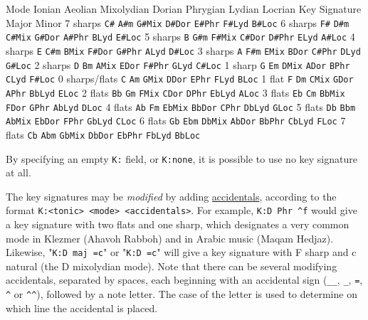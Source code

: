 \documentclass[oneside]{book}
\begin{document}
Mode Ionian Aeolian Mixolydian Dorian Phrygian Lydian Locrian Key
Signature Major Minor 7 sharps \texttt{C\#} \texttt{A\#m}
\texttt{G\#Mix} \texttt{D\#Dor} \texttt{E\#Phr} \texttt{F\#Lyd}
\texttt{B\#Loc} 6 sharps \texttt{F\#} \texttt{D\#m} \texttt{C\#Mix}
\texttt{G\#Dor} \texttt{A\#Phr} \texttt{BLyd} \texttt{E\#Loc} 5 sharps
\texttt{B} \texttt{G\#m} \texttt{F\#Mix} \texttt{C\#Dor} \texttt{D\#Phr}
\texttt{ELyd} \texttt{A\#Loc} 4 sharps \texttt{E} \texttt{C\#m}
\texttt{BMix} \texttt{F\#Dor} \texttt{G\#Phr} \texttt{ALyd}
\texttt{D\#Loc} 3 sharps \texttt{A} \texttt{F\#m} \texttt{EMix}
\texttt{BDor} \texttt{C\#Phr} \texttt{DLyd} \texttt{G\#Loc} 2 sharps
\texttt{D} \texttt{Bm} \texttt{AMix} \texttt{EDor} \texttt{F\#Phr}
\texttt{GLyd} \texttt{C\#Loc} 1 sharp \texttt{G} \texttt{Em}
\texttt{DMix} \texttt{ADor} \texttt{BPhr} \texttt{CLyd} \texttt{F\#Loc}
0 sharps/flats \texttt{C} \texttt{Am} \texttt{GMix} \texttt{DDor}
\texttt{EPhr} \texttt{FLyd} \texttt{BLoc} 1 flat \texttt{F} \texttt{Dm}
\texttt{CMix} \texttt{GDor} \texttt{APhr} \texttt{BbLyd} \texttt{ELoc} 2
flats \texttt{Bb} \texttt{Gm} \texttt{FMix} \texttt{CDor} \texttt{DPhr}
\texttt{EbLyd} \texttt{ALoc} 3 flats \texttt{Eb} \texttt{Cm}
\texttt{BbMix} \texttt{FDor} \texttt{GPhr} \texttt{AbLyd} \texttt{DLoc}
4 flats \texttt{Ab} \texttt{Fm} \texttt{EbMix} \texttt{BbDor}
\texttt{CPhr} \texttt{DbLyd} \texttt{GLoc} 5 flats \texttt{Db}
\texttt{Bbm} \texttt{AbMix} \texttt{EbDor} \texttt{FPhr} \texttt{GbLyd}
\texttt{CLoc} 6 flats \texttt{Gb} \texttt{Ebm} \texttt{DbMix}
\texttt{AbDor} \texttt{BbPhr} \texttt{CbLyd} \texttt{FLoc} 7 flats
\texttt{Cb} \texttt{Abm} \texttt{GbMix} \texttt{DbDor} \texttt{EbPhr}
\texttt{FbLyd} \texttt{BbLoc}

By specifying an empty \texttt{K:} field, or \texttt{K:none}, it is
possible to use no key signature at all.

The key signatures may be \emph{modified} by adding
\protect\hyperlink{accidentals}{accidentals}, according to the format
\texttt{K:\textless{}tonic\textgreater{}\ \textless{}mode\textgreater{}\ \textless{}accidentals\textgreater{}}.
For example, \texttt{K:D\ Phr\ \^{}f} would give a key signature with
two flats and one sharp, which designates a very common mode in Klezmer
(Ahavoh Rabboh) and in Arabic music (Maqam Hedjaz). Likewise,
"\texttt{K:D\ maj\ =c}" or "\texttt{K:D\ =c}" will give a key signature
with F sharp and c natural (the D mixolydian mode). Note that there can
be several modifying accidentals, separated by spaces, each beginning
with an accidental sign (\texttt{\_\_}, \texttt{\_}, \texttt{=},
\texttt{\^{}} or \texttt{\^{}\^{}}), followed by a note letter. The case
of the letter is used to determine on which line the accidental is
placed.
\end{document}
